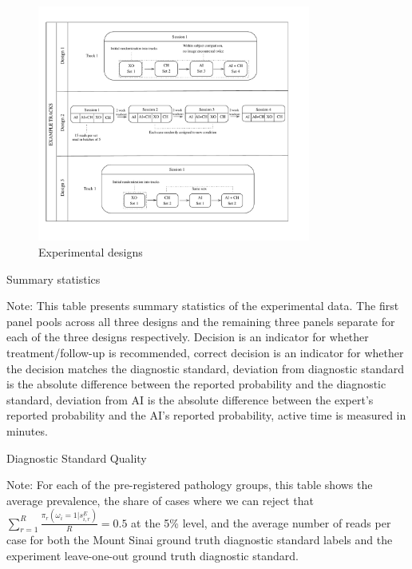 \begin{figure}[ht]
    \centering
    \includegraphics[width=0.8\textwidth]{images/designs.pdf}    
    \caption{Experimental designs}
    \label{fig:experiment_design}
\end{figure}

\begin{table}[ht]
    \centering
    \caption{Summary statistics\label{tab:summary_statistics}}
    
    \noindent\begin{minipage}[t]{1\columnwidth}%
    {\scriptsize{}Note: This table presents summary statistics of the
    experimental data. The first panel pools across all three designs
    and the remaining three panels separate for each of the three designs
    respectively. Decision is an indicator for whether treatment/follow-up
    is recommended, correct decision is an indicator for whether the decision
    matches the diagnostic standard, deviation from diagnostic standard is the absolute
    difference between the reported probability and the diagnostic standard,
    deviation from AI is the absolute difference between the expert's
    reported probability and the AI's reported probability, active time
    is measured in minutes.}%
    \end{minipage}
\end{table}

\begin{table}[H]
    \centering
    \caption{Diagnostic Standard Quality}
    
    \label{tab:diag_standard_quality}
    \noindent\begin{minipage}[t]{1\columnwidth}%
    {\scriptsize{}Note: For each of the pre-registered pathology groups, this table shows the average prevalence, the share of cases where we can reject that $\sum_{r=1}^{R}\frac{\pi_{r}(\omega_{i}=1|s_{i,r}^{E})}{R}=0.5$ at the 5\% level, and the average number of reads per case for both the Mount Sinai ground truth diagnostic standard labels and the experiment leave-one-out ground truth diagnostic standard.}%
    \end{minipage}
\end{table}

